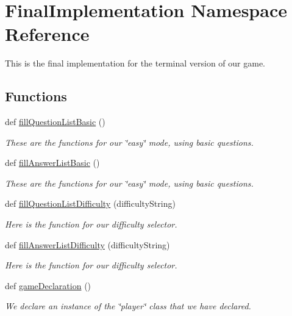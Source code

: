 \hypertarget{namespaceFinalImplementation}{}\section{Final\+Implementation Namespace Reference}
\label{namespaceFinalImplementation}


This is the final implementation for the terminal version of our game.  


\subsection*{Functions}
\begin{DoxyCompactItemize}
\item 
def \hyperlink{namespaceFinalImplementation_a25c3c3849d1e0714aa3169c3373a8ca9}{fill\+Question\+List\+Basic} ()
\begin{DoxyCompactList}\small\item\em These are the functions for our \char`\"{}easy\char`\"{} mode, using basic questions. \end{DoxyCompactList}\item 
def \hyperlink{namespaceFinalImplementation_a3ee1313f80091058022140774405d079}{fill\+Answer\+List\+Basic} ()
\begin{DoxyCompactList}\small\item\em These are the functions for our \char`\"{}easy\char`\"{} mode, using basic questions. \end{DoxyCompactList}\item 
def \hyperlink{namespaceFinalImplementation_af8efb9340c8853e9770c4202b800f861}{fill\+Question\+List\+Difficulty} (difficulty\+String)
\begin{DoxyCompactList}\small\item\em Here is the function for our difficulty selector. \end{DoxyCompactList}\item 
def \hyperlink{namespaceFinalImplementation_aee57577289eb0d9d0dbd6be0d7e2b34d}{fill\+Answer\+List\+Difficulty} (difficulty\+String)
\begin{DoxyCompactList}\small\item\em Here is the function for our difficulty selector. \end{DoxyCompactList}\item 
def \hyperlink{namespaceFinalImplementation_a9c2ba6f23e14c2ff8869b0656ba45b53}{game\+Declaration} ()
\begin{DoxyCompactList}\small\item\em We declare an instance of the \char`\"{}player\char`\"{} class that we have declared. \end{DoxyCompactList}\end{DoxyCompactItemize}
